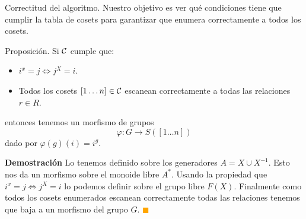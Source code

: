 \documentclass[aspectratio=169, 9pt]{beamer}
\renewcommand\qedsymbol{\textcolor{orange}{$\blacksquare$}}
\newcommand{\In}{[1 \dots n]}
\newcommand{\Co}{{\cal{C}}}
\begin{document}
%	
%	
%	

\begin{frame}[fragile]{Correctitud del algoritmo.}
	Nuestro objetivo es ver qué condiciones tiene que cumplir la tabla de cosets para garantizar que enumera correctamente a todos los cosets.
	
	\pause
	\begin{alertblock}{Proposición.}
		Si $\Co$ cumple que:
		\begin{itemize}
			\item  $i^x = j \iff j^{X} = i$.
			\item Todos los cosets $\In \in \Co$ escanean correctamente a todas las relaciones $r \in R$. 
		\end{itemize}
		entonces tenemos un morfismo de grupos 
		\[
			\varphi: G \to S(\In)
		\]
		dado por $\varphi(g) (i) = i^g$.
	\end{alertblock}
	\medskip
	\pause
	\textbf{Demostración}
	Lo tenemos definido sobre los generadores $A = X \cup X^{-1}$.
	\pause 
	Esto nos da un morfismo sobre el monoide libre $A^{*}$.
	\pause
	Usando la propiedad que $i^x = j \iff j^{X} = i$ lo podemos definir sobre el grupo libre $F(X)$.
	\pause
	Finalmente como todos los cosets enumerados escanean correctamente todas las relaciones tenemos que baja a un morfismo del grupo $G$. \qedsymbol
\end{frame}
\end{document}
